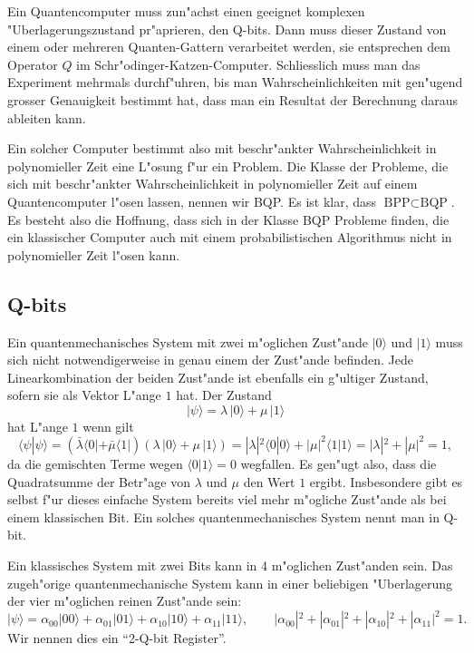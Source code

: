 Ein Quantencomputer muss zun"achst einen geeignet komplexen
"Uberlagerungszustand pr"aprieren, den Q-bits. Dann muss dieser Zustand
von einem oder mehreren Quanten-Gattern verarbeitet werden, sie
entsprechen dem Operator $Q$ im Schr"odinger-Katzen-Computer.
Schliesslich muss man das Experiment mehrmals durchf"uhren, bis man
Wahrscheinlichkeiten mit gen"ugend grosser Genauigkeit bestimmt hat,
dass man ein Resultat der Berechnung daraus ableiten kann.

Ein solcher Computer bestimmt also mit beschr"ankter Wahrscheinlichkeit
in polynomieller Zeit eine L"osung f"ur ein Problem. Die
Klasse der Probleme, die sich mit beschr"ankter Wahrscheinlichkeit in
polynomieller Zeit auf einem Quantencomputer l"osen lassen, nennen wir
BQP.
Es ist klar, dass $\text{BPP}\subset\text{BQP}$.
Es besteht also die Hoffnung, dass sich in der Klasse BQP Probleme finden,
die ein klassischer Computer auch mit einem probabilistischen Algorithmus
nicht in polynomieller Zeit l"osen kann.

\subsection{Q-bits}
Ein quantenmechanisches System mit zwei m"oglichen Zust"ande $|0\rangle$
und $|1\rangle$ muss sich nicht
notwendigerweise in genau einem der Zust"ande befinden.
Jede Linearkombination der beiden Zust"ande ist ebenfalls ein g"ultiger
Zustand, sofern sie als Vektor L"ange $1$ hat.
Der Zustand
\[
|\psi\rangle
=
\lambda \,|0\rangle + \mu\,|1\rangle
\]
hat L"ange $1$ wenn gilt
\[
\langle\psi|\psi\rangle
=
(
\bar\lambda
\langle 0|
+
\bar\mu
\langle 1|
)
(
\lambda \,|0\rangle + \mu\,|1\rangle
)
=
|\lambda|^2\langle 0|0\rangle + |\mu|^2\langle 1|1\rangle
=
|\lambda|^2+|\mu|^2
=
1
,
\]
da die gemischten Terme wegen $\langle 0|1\rangle=0$ wegfallen.
Es gen"ugt also, dass die Quadratsumme der Betr"age von $\lambda$ und $\mu$
den Wert $1$ ergibt.
Insbesondere gibt es selbst f"ur dieses einfache System bereits viel
mehr m"ogliche Zust"ande als bei einem klassischen Bit.
Ein solches quantenmechanisches System nennt man in Q-bit.

Ein klassisches System mit zwei Bits kann in 4 m"oglichen Zust"anden sein.
Das zugeh"orige quantenmechanische System kann in einer beliebigen
"Uberlagerung der vier m"oglichen reinen Zust"ande sein:
\[
|\psi\rangle
=
\alpha_{00}|00\rangle
+
\alpha_{01}|01\rangle
+
\alpha_{10}|10\rangle
+
\alpha_{11}|11\rangle
,\qquad
|\alpha_{00}|^2
+
|\alpha_{01}|^2
+
|\alpha_{10}|^2
+
|\alpha_{11}|^2
=1.
\]
Wir nennen dies ein ``2-Q-bit Register''.

